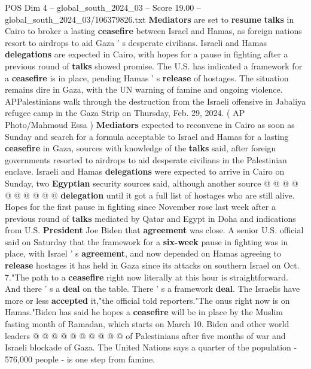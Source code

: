 \begin{textsample}{POS Dim 4 – global\_south\_2024\_03 – Score 19.00 – global\_south\_2024\_03/106379826.txt}  \label{ex:f4_pos_108}
\textbf{Mediators} are set to \textbf{resume} \textbf{talks} in Cairo to broker a lasting \textbf{ceasefire} between Israel and Hamas, as foreign nations resort to airdrops to aid Gaza ' s desperate civilians.
Israeli and Hamas \textbf{delegations} are expected in Cairo, with hopes for a pause in fighting after a previous round of \textbf{talks} showed promise.
The U.S. has indicated a framework for a \textbf{ceasefire} is in place, pending Hamas ' s \textbf{release} of hostages.
The situation remains dire in Gaza, with the UN warning of famine and ongoing violence.
APPalestinians walk through the destruction from the Israeli offensive in Jabaliya refugee camp in the Gaza Strip on Thursday, Feb. 29, 2024. ( AP Photo/Mahmoud Essa ) \textbf{Mediators} expected to reconvene in Cairo as soon as Sunday and search for a formula acceptable to Israel and Hamas for a lasting \textbf{ceasefire} in Gaza, sources with knowledge of the \textbf{talks} said, after foreign governments resorted to airdrops to aid desperate civilians in the Palestinian enclave.
Israeli and Hamas \textbf{delegations} were expected to arrive in Cairo on Sunday, two \textbf{Egyptian} security sources said, although another source @ @ @ @ @ @ @ @ @ @ \textbf{delegation} until it got a full list of hostages who are still alive.
Hopes for the first pause in fighting since November rose last week after a previous round of \textbf{talks} mediated by Qatar and Egypt in Doha and indications from U.S. \textbf{President} Joe Biden that \textbf{agreement} was close.
A senior U.S. official said on Saturday that the framework for a \textbf{six-week} pause in fighting was in place, with Israel ' s \textbf{agreement}, and now depended on Hamas agreeing to \textbf{release} hostages it has held in Gaza since its attacks on southern Israel on Oct. 7."The path to a \textbf{ceasefire} right now literally at this hour is straightforward.
And there ' s a \textbf{deal} on the table.
There ' s a framework \textbf{deal}.
The Israelis have more or less \textbf{accepted} it,"the official told reporters."The onus right now is on Hamas."Biden has said he hopes a \textbf{ceasefire} will be in place by the Muslim fasting month of Ramadan, which starts on March 10.
Biden and other world leaders @ @ @ @ @ @ @ @ @ @ of Palestinians after five months of war and Israeli blockade of Gaza.
The United Nations says a quarter of the population - 576,000 people - is one step from famine.

\end{textsample}
